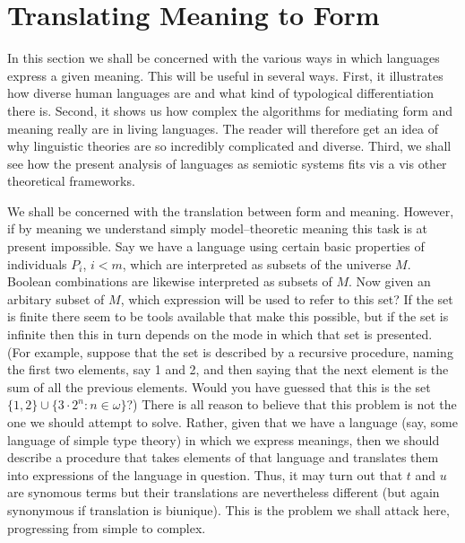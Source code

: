 \section{Translating Meaning to Form}
%
%
%
In this section we shall be concerned with the various ways in
which languages express a given meaning. This will be useful in several
ways. First, it illustrates how diverse human languages are and what
kind of typological differentiation there is. Second, it shows us how
complex the algorithms for mediating form and meaning really are in
living languages. The reader will therefore get an idea of why
linguistic theories are so incredibly complicated and diverse. Third,
we shall see how the present analysis of languages as semiotic systems
fits vis a vis other theoretical frameworks.

We shall be concerned with the translation between form and
meaning. However, if by meaning we understand simply
model--theoretic meaning this task is at present impossible. Say
we have a language using certain basic properties of individuals
$P_i$, $i < m$, which are interpreted as subsets of the universe
$M$. Boolean combinations are likewise interpreted as subsets of
$M$. Now given an arbitary subset of $M$, which expression will be
used to refer to this set? If the set is finite there seem to be
tools available that make this possible, but if the set is
infinite then this in turn depends on the mode in which that set
is presented. (For example, suppose that the set is described by a
recursive procedure, naming the first two elements, say 1 and 2,
and then saying that the next element is the sum of all the
previous elements. Would you have guessed that this is the set
$\{1,2\} \cup \{3\cdot 2^n : n \in \omega\}$?) There is all reason
to believe that this problem is not the one we should attempt to
solve. Rather, given that we have a language (say, some language
of simple type theory) in which we express meanings, then we
should describe a procedure that takes elements of that language
and translates them into expressions of the language in question.
Thus, it may turn out that $t$ and $u$ are synomous terms but
their translations are nevertheless different (but again
synonymous if translation is biunique). This is the problem we
shall attack here, progressing from simple to complex.


